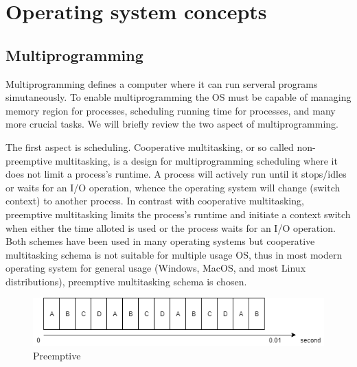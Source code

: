 \section[Operating system concepts]{Operating system concepts}

\subsection[Multiprogramming]{Multiprogramming}

Multiprogramming defines a computer where it can run serveral programs simutaneously. To enable multiprogramming the OS must be capable of managing memory region for processes, scheduling running time for processes, and many more crucial tasks. We will briefly review the two aspect of multiprogramming.

The first aspect is scheduling. Cooperative multitasking, or so called non-preemptive multitasking, is a design for multiprogramming scheduling where it does not limit a process's runtime. A process will actively run until it stops/idles or waits for an I/O operation, whence the operating system will change (switch context) to another process. In contrast with cooperative multitasking, preemptive multitasking limits the process's runtime and initiate a context switch when either the time alloted is used or the process waits for an I/O operation. Both schemes have been used in many operating systems but cooperative multitasking schema is not suitable for multiple usage OS, thus in most modern operating system for general usage (Windows, MacOS, and most Linux distributions), preemptive multitasking schema is chosen.

\begin{figure}
  \centering
  \caption{Preemptive}
  \includegraphics[scale=0.8]{images/preemptive.png}
\end{figure}

